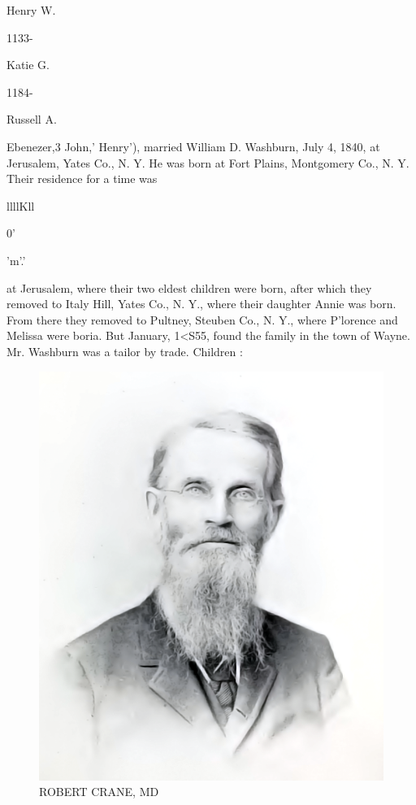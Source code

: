 \documentclass[oneside]{book}
\begin{document}
Henry W. 


1133- 




Katie G. 


1184- 




Russell A. 



Ebenezer,3 John,' Henry'), married William D. Washburn, July 
4, 1840, at Jerusalem, Yates Co., N. Y. He was born at Fort 
Plains, Montgomery Co., N. Y. Their residence for a time was 



llllKll 



0' 





'm'.' 




at Jerusalem, where their two eldest children were born, after 
which they removed to Italy Hill, Yates Co., N. Y., where their 
daughter Annie was born. From there they removed to Pultney, 
Steuben Co., N. Y., where P'lorence and Melissa were boria. 
But January, 1<S55, found the family in the town of Wayne. 
Mr. Washburn was a tailor by trade. Children : 




\begin{figure}[htp]
	\centering
	\includegraphics[scale=0.75]{../white/robertCraneMDWhite.png}
	\caption {ROBERT CRANE, MD}
\end{figure}
\end{document}
